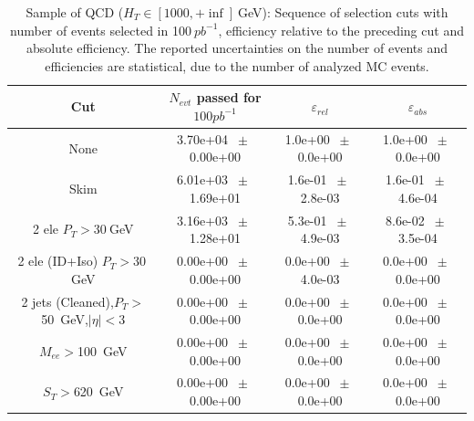 \begin{table}[htbp] 
\begin{center} 
\begin{tabular}{|c|c|c|c|} 
\hline\hline 
 Cut & $N_{evt}$ passed for $100pb^{-1}$ & $\varepsilon_{rel}$ & $\varepsilon_{abs}$ \\ 
\hline\hline 
None       &        3.70e+04       $~\pm~$       0.00e+00        &        1.0e+00       $~\pm~$       0.0e+00        &        1.0e+00       $~\pm~$       0.0e+00       \\       
       Skim       &        6.01e+03       $~\pm~$       1.69e+01        &        1.6e-01       $~\pm~$       2.8e-03        &        1.6e-01       $~\pm~$       4.6e-04       \\       
       2 ele $P_T>30~$GeV       &        3.16e+03       $~\pm~$       1.28e+01        &        5.3e-01       $~\pm~$       4.9e-03        &        8.6e-02       $~\pm~$       3.5e-04       \\       
       2 ele (ID+Iso) $P_T>30~$GeV       &        0.00e+00       $~\pm~$       0.00e+00        &        0.0e+00       $~\pm~$       4.0e-03        &        0.0e+00       $~\pm~$       0.0e+00       \\       
       2 jets (Cleaned),$P_T>$50~GeV,$|\eta|<$3       &        0.00e+00       $~\pm~$       0.00e+00        &        0.0e+00       $~\pm~$       0.0e+00        &        0.0e+00       $~\pm~$       0.0e+00       \\       
       $M_{ee}>$100~GeV       &        0.00e+00       $~\pm~$       0.00e+00        &        0.0e+00       $~\pm~$       0.0e+00        &        0.0e+00       $~\pm~$       0.0e+00       \\       
       $S_T>$620~GeV       &        0.00e+00       $~\pm~$       0.00e+00        &        0.0e+00       $~\pm~$       0.0e+00        &        0.0e+00       $~\pm~$       0.0e+00       \\       
       \hline\hline 
\end{tabular} 
\end{center} 
\caption{Sample of QCD ($H_T \in [1000,+\inf]~$GeV): Sequence of selection cuts with number of events selected in 100$~pb^{-1}$, efficiency relative to the preceding cut and absolute efficiency. The reported uncertainties on the number of events and efficiencies are statistical, due to the number of analyzed MC events.} 
\label{tab:effic-QCD-1000-inf} 
\end{table} 



